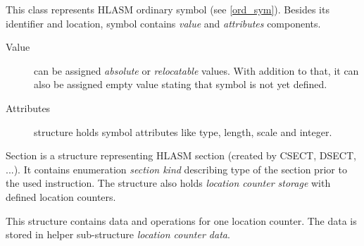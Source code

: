 This class represents HLASM ordinary symbol (see \cref{ord_sym}). Besides its identifier and location, symbol contains \emph{value} and \emph{attributes} components.

\begin{description}
	\item[Value] can be assigned \emph{absolute} or \emph{relocatable} values. With addition to that, it can also be assigned empty value stating that symbol is not yet defined.
	\item[Attributes] structure holds symbol attributes like type, length, scale and integer.
\end{description}

Section is a structure representing HLASM section (created by CSECT, DSECT, ...). It contains enumeration \emph{section kind} describing type of the section prior to the used instruction. The structure also holds \emph{location counter storage} with defined location counters.

This structure contains data and operations for one location counter. The data is stored in helper sub-structure \emph{location counter data}.

